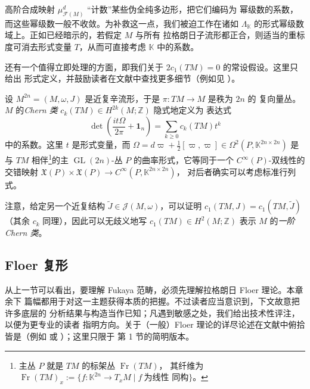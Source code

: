 
高阶合成映射 $\mu^d_{\mathcal F(M)}$ “计数”某些伪全纯多边形，把它们编码为
幂级数的系数，而这些幂级数一般不收敛。为补救这一点，我们被迫工作在诸如
$\Lambda_{\mathbb K}$ 的形式幂级数域上。正如已经暗示的，若假定 $M$ 与所有
拉格朗日子流形都正合，则适当的重标度可消去形式变量 $T$，从而可直接考虑
$\mathbb K$ 中的系数。

还有一个值得立即处理的方面，即我们关于 $2c_1(TM)=0$ 的常设假设。这里只给出
形式定义，并鼓励读者在文献中查找更多细节（例如见 \cite{MS74}）。

\begin{Def}\label{def:5.10}
设 $M^{2n}=(M,\omega,J)$ 是近复辛流形，于是 $\pi:TM\to M$ 是秩为 $2n$ 的
复向量丛。$M$ 的\emph{Chern 类} $c_k(TM)\in H^{2k}(M;\mathbb Z)$ 隐式地定义为
表达式
\[
\det\left(\frac{it\Omega}{2\pi}+\mathbf 1_n\right)=\sum_{k\ge0}c_k(TM)t^k
\]
中的系数。这里 $t$ 是形式变量，而
$\Omega=d\varpi+\frac12[\varpi,\varpi]\in\Omega^2(P,\mathbb K^{2n\times2n})$
是与 $TM$ 相伴\footnote{主丛 $P$ 就是 $TM$ 的标架丛 $\operatorname{Fr}(TM)$，
其纤维为 $\operatorname{Fr}(TM)_x:=\{f:\mathbb K^{2n}\to T_xM\mid f\ \text{为线性
同构}\}$。}的主 $\operatorname{GL}(2n)$-丛 $P$ 的曲率形式，它等同于一个
$C^\infty(P)$-双线性的交错映射
$\mathfrak X(P)\times\mathfrak X(P)\to C^\infty(P,\mathbb K^{2n\times2n})$，
对后者确实可以考虑标准行列式。

注意，给定另一个近复结构 $\widetilde J\in\mathcal J(M,\omega)$，可以证明
$c_1(TM,J)=c_1(TM,\widetilde J)$（其余 $c_k$ 同理），因此可以无歧义地写
$c_1(TM)\in H^2(M;\mathbb Z)$ 表示 $M$ 的\emph{一阶 Chern 类}。
\end{Def}

\medskip
\noindent{}
\medskip

\subsection{Floer 复形}\label{sec:5.3}

从上一节可以看出，要理解 Fukaya 范畴，必须先理解拉格朗日 Floer 理论。本章余下
篇幅都用于对这一主题获得本质的把握。不过读者应当意识到，下文故意把许多底层的
分析结果与构造当作已知；凡遇到敏感之处，我们给出技术性评注，以便为更专业的读者
指明方向。关于（一般）Floer 理论的详尽论述在文献中俯拾皆是（例如 \cite{Sal97}
或 \cite{Mer14}）；这里只限于 \cite{Aur13} 第 1 节的简明版本。

